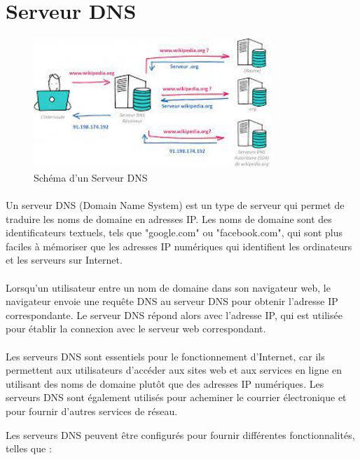  \section{Serveur DNS}
	\begin{figure}[h]
	\hbox{\includegraphics[width=0.8\textwidth]{PhotoMemoire/serveur_dns.jpeg}}
	\caption{Schéma d'un Serveur DNS}
\end{figure}
\paragraph{ }
Un serveur DNS (Domain Name System) est un type de serveur qui permet de traduire les noms de domaine en adresses IP. Les noms de domaine sont des identificateurs textuels, tels que "google.com" ou "facebook.com", qui sont plus faciles à mémoriser que les adresses IP numériques qui identifient les ordinateurs et les serveurs sur Internet.
\paragraph{ }
Lorsqu'un utilisateur entre un nom de domaine dans son navigateur web, le navigateur envoie une requête DNS au serveur DNS pour obtenir l'adresse IP correspondante. Le serveur DNS répond alors avec l'adresse IP, qui est utilisée pour établir la connexion avec le serveur web correspondant.
\paragraph{ }
Les serveurs DNS sont essentiels pour le fonctionnement d'Internet, car ils permettent aux utilisateurs d'accéder aux sites web et aux services en ligne en utilisant des noms de domaine plutôt que des adresses IP numériques. Les serveurs DNS sont également utilisés pour acheminer le courrier électronique et pour fournir d'autres services de réseau.

Les serveurs DNS peuvent être configurés pour fournir différentes fonctionnalités, telles que :

